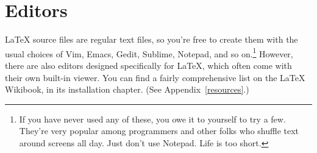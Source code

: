 \section{Editors}

\LaTeX{} source files are regular text files,
so you're free to create them with the usual choices of Vim, Emacs, Gedit,
Sublime, Notepad\plusplus, and so on.\punckern\footnote{If you have never used
any of these, you owe it to yourself to try a few.
They're very popular among programmers and other folks who shuffle text around
screens all day. Just don't use Notepad. Life is too short.}
However, there are also editors designed specifically for \LaTeX{},
which often come with their own built-in  viewer.
You can find a fairly comprehensive list on the \LaTeX{} Wikibook,
in its installation chapter. (See Appendix~\ref{resources}.)

